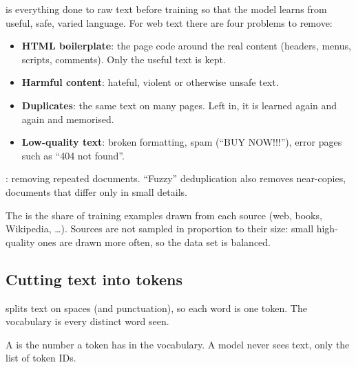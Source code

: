 \begin{definition}
 is everything done to raw text before training so that the model learns from useful, safe, varied language. For web text there are four problems to remove:
\begin{itemize}
  \item \textbf{HTML boilerplate}: the page code around the real content (headers, menus, scripts, comments). Only the useful text is kept.
  \item \textbf{Harmful content}: hateful, violent or otherwise unsafe text.
  \item \textbf{Duplicates}: the same text on many pages. Left in, it is learned again and again and memorised.
  \item \textbf{Low-quality text}: broken formatting, spam (``BUY NOW!!!''), error pages such as ``404 not found''.
\end{itemize}
\end{definition}

\begin{definition}[Deduplication]
: removing repeated documents. ``Fuzzy'' deduplication also removes near-copies, documents that differ only in small details.
\end{definition}

\begin{definition}
The  is the share of training examples drawn from each source (web, books, Wikipedia, \dots). Sources are not sampled in proportion to their size: small high-quality ones are drawn more often, so the data set is balanced.
\end{definition}

\subsection*{Cutting text into tokens}

\begin{definition}
 splits text on spaces (and punctuation), so each word is one token. The vocabulary is every distinct word seen.
\end{definition}

\begin{definition}[Token ID]
A  is the number a token has in the vocabulary. A model never sees text, only the list of token IDs.
\end{definition}

